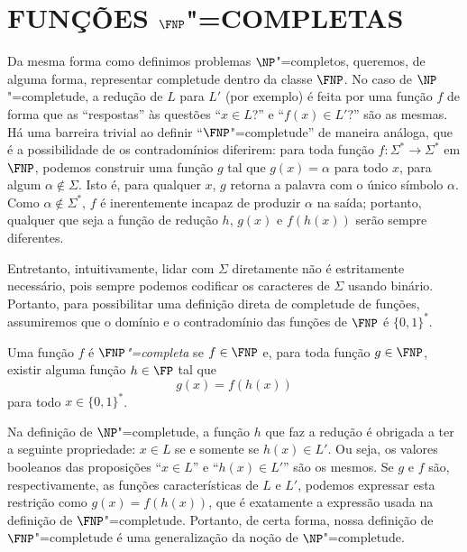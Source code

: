 \section{FUNÇÕES $\FNP$"=COMPLETAS}
\label{sec:fnp_complete}

Da mesma forma como definimos problemas $\NP$"=completos,
queremos, de alguma forma,
representar completude dentro da classe $\FNP$.
No caso de $\NP$"=completude,
a redução de $L$ para $L'$ (por exemplo)
é feita por uma função $f$ de forma que
as ``respostas'' às questões ``$x \in L$?'' e ``$f(x) \in L'$?'' são as mesmas.
Há uma barreira trivial ao definir ``$\FNP$"=completude'' de maneira análoga,
que é a possibilidade de os contradomínios diferirem:
para toda função $f: \Sigma^* \to \Sigma^*$ em $\FNP$,
podemos construir uma função $g$ tal que $g(x) = \alpha$ para todo $x$,
para algum $\alpha \notin \Sigma$.
Isto é, para qualquer $x$, $g$ retorna a palavra com o único símbolo $\alpha$.
Como $\alpha \notin \Sigma^*$,
$f$ é inerentemente incapaz de produzir $\alpha$ na saída;
portanto, qualquer que seja a função de redução $h$,
$g(x)$ e $f(h(x))$ serão sempre diferentes.

Entretanto, intuitivamente,
lidar com $\Sigma$ diretamente não é estritamente necessário,
pois sempre podemos codificar os caracteres de $\Sigma$ usando binário.
Portanto,
para possibilitar uma definição direta de completude de funções,
assumiremos que o domínio e o contradomínio das funções de $\FNP$
é $\{0, 1\}^*$.

\begin{definition}
    Uma função $f$ é \emph{$\FNP$"=completa}
    se $f \in \FNP$ e,
    para toda função $g \in \FNP$,
    existir alguma função $h \in \FP$ tal que
    \begin{equation*}
        g(x) = f(h(x))
    \end{equation*}
    para todo $x \in \{0, 1\}^*$.
\end{definition}

Na definição de $\NP$"=completude,
a função $h$ que faz a redução é obrigada a ter a seguinte propriedade:
$x \in L$ se e somente se $h(x) \in L'$.
Ou seja, os valores booleanos das proposições
``$x \in L$'' e ``$h(x) \in L'$'' são os mesmos.
Se $g$ e $f$ são, respectivamente,
as funções características de $L$ e $L'$,
podemos expressar esta restrição como
$g(x) = f(h(x))$,
que é exatamente a expressão usada na definição de $\FNP$"=completude.
Portanto, de certa forma,
nossa definição de $\FNP$"=completude
é uma generalização da noção de $\NP$"=completude.

